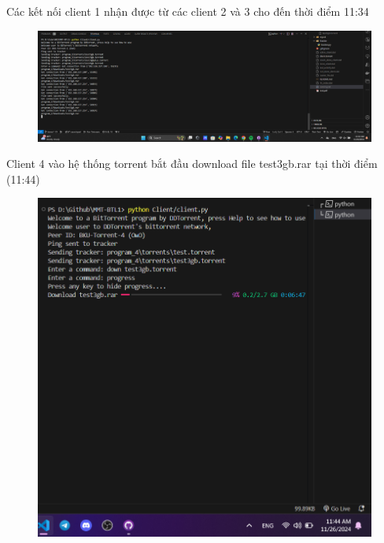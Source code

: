 \documentclass[a4paper]{article}
\begin{document}
Các kết nối client 1 nhận được từ các client 2 và 3 cho đến thời điểm 11:34
\begin{figure}[H]
    \centering
    \includegraphics[width=1\textwidth]{images/16.png}
    \captionsetup{labelformat=empty}
\end{figure}
Client 4 vào hệ thống torrent bắt đầu download file test3gb.rar tại thời điểm (11:44)
\begin{figure}[H]
    \centering
    \includegraphics[width=1\textwidth]{images/17.png}
    \captionsetup{labelformat=empty}
\end{figure}
\end{document}
